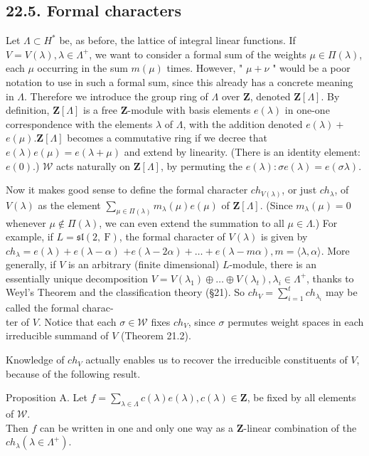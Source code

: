 \documentclass[10pt]{article}
\begin{document}
\subsection*{22.5. Formal characters}
Let $\Lambda \subset H^{*}$ be, as before, the lattice of integral linear functions. If $V=V(\lambda), \lambda \in \Lambda^{+}$, we want to consider a formal sum of the weights $\mu \in \Pi(\lambda)$, each $\mu$ occurring in the sum $m(\mu)$ times. However, " $\mu+\nu$ " would be a poor notation to use in such a formal sum, since this already has a concrete meaning in $\Lambda$. Therefore we introduce the group ring of $\Lambda$ over $\mathbf{Z}$, denoted $\mathbf{Z}[\Lambda]$. By definition, $\mathbf{Z}[\Lambda]$ is a free $\mathbf{Z}$-module with basis elements $e(\lambda)$ in one-one correspondence with the elements $\lambda$ of $\Lambda$, with the addition denoted $e(\lambda)+$ $e(\mu) . \mathbf{Z}[\Lambda]$ becomes a commutative ring if we decree that $e(\lambda) e(\mu)=e(\lambda+\mu)$ and extend by linearity. (There is an identity element: $e(0)$.) $\mathscr{W}$ acts naturally on $\mathbf{Z}[\Lambda]$, by permuting the $e(\lambda): \sigma e(\lambda)=e(\sigma \lambda)$.

Now it makes good sense to define the formal character $c h_{V(\lambda)}$, or just $c h_{\lambda}$, of $V(\lambda)$ as the element $\sum_{\mu \in \Pi(\lambda)} m_{\lambda}(\mu) e(\mu)$ of $\mathbf{Z}[\Lambda]$. (Since $m_{\lambda}(\mu)=0$ whenever $\mu \notin \Pi(\lambda)$, we can even extend the summation to all $\mu \in \Lambda$.) For example, if $L=\mathfrak{s l}(2, \mathrm{~F})$, the formal character of $V(\lambda)$ is given by $c h_{\lambda}=e(\lambda)+e(\lambda-\alpha)$ $+e(\lambda-2 \alpha)+\ldots+e(\lambda-m \alpha), m=\langle\lambda, \alpha\rangle$. More generally, if $V$ is an arbitrary (finite dimensional) $L$-module, there is an essentially unique decomposition $V=V\left(\lambda_{1}\right) \oplus \ldots \oplus V\left(\lambda_{t}\right), \lambda_{i} \in \Lambda^{+}$, thanks to Weyl's Theorem and the classification theory (§21). So $c h_{V}=\sum_{i=1}^{t} c h_{\lambda_{i}}$ may be called the formal charac-\\
ter of $V$. Notice that each $\sigma \in \mathscr{W}$ fixes $c h_{V}$, since $\sigma$ permutes weight spaces in each irreducible summand of $V$ (Theorem 21.2).

Knowledge of $c h_{V}$ actually enables us to recover the irreducible constituents of $V$, because of the following result.

Proposition A. Let $f=\sum_{\lambda \in \Lambda} c(\lambda) e(\lambda), c(\lambda) \in \mathbf{Z}$, be fixed by all elements of $\mathscr{W}$.\\
Then $f$ can be written in one and only one way as a $\mathbf{Z}$-linear combination of the $c h_{\lambda}\left(\lambda \in \Lambda^{+}\right)$.
\end{document}
